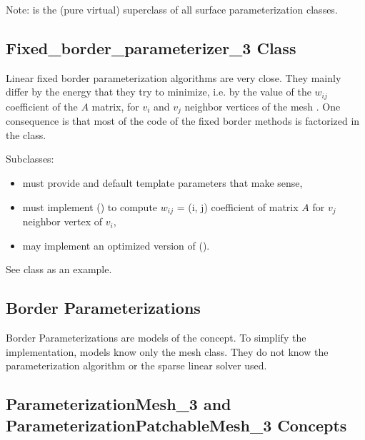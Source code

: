 Note:  is the (pure virtual)
superclass of all surface parameterization classes.


\subsection{Fixed\_border\_parameterizer\_3 Class}

Linear fixed border parameterization algorithms are very close. They mainly
differ by the energy that they try to minimize, i.e. by the value of the $w_{ij}$
coefficient of the $A$ matrix, for $v_i$ and $v_j$ neighbor vertices of the mesh
\cite{cgal:fh-survey-05}. One consequence is that most of the code of the fixed border methods is factorized in the
 class.

Subclasses:
\begin{itemize}
\item must provide  and 
      default template parameters that make sense,
\item must implement () to compute $w_{ij}$ = (i, j) coefficient
      of matrix $A$ for $v_j$ neighbor vertex of $v_i$,
\item may implement an optimized version of ().
\end{itemize}

See 
class as an example.


\subsection{Border Parameterizations}

Border Parameterizations are models of the  concept.
To simplify the implementation,  models know only the
 mesh class. They do not know the parameterization algorithm or the sparse linear solver used.


\subsection{ParameterizationMesh\_3 and ParameterizationPatchableMesh\_3 Concepts}

